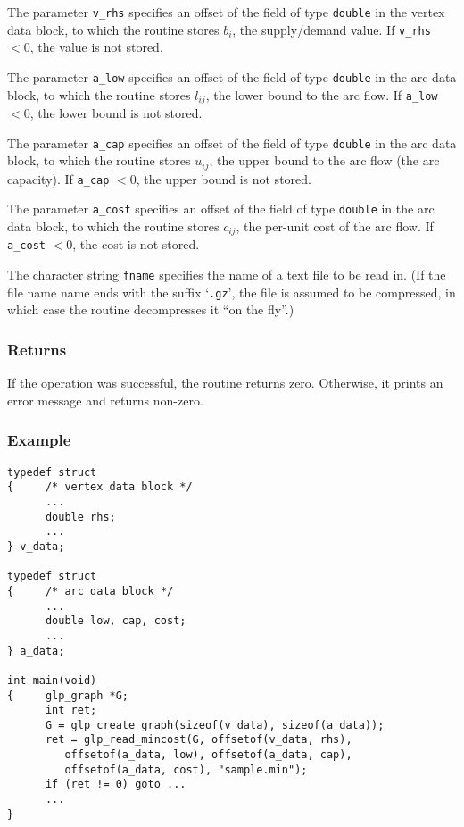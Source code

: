 The parameter \verb|v_rhs| specifies an offset of the field of type
\verb|double| in the vertex data block, to which the routine stores
$b_i$, the supply/demand value. If \verb|v_rhs| $<0$, the value is not
stored.

The parameter \verb|a_low| specifies an offset of the field of type
\verb|double| in the arc data block, to which the routine stores
$l_{ij}$, the lower bound to the arc flow. If \verb|a_low| $<0$, the
lower bound is not stored.

The parameter \verb|a_cap| specifies an offset of the field of type
\verb|double| in the arc data block, to which the routine stores
$u_{ij}$, the upper bound to the arc flow (the arc capacity). If
\verb|a_cap| $<0$, the upper bound is not stored.

The parameter \verb|a_cost| specifies an offset of the field of type
\verb|double| in the arc data block, to which the routine stores
$c_{ij}$, the per-unit cost of the arc flow. If \verb|a_cost| $<0$, the
cost is not stored.

The character string \verb|fname| specifies the name of a text file to
be read in. (If the file name name ends with the suffix `\verb|.gz|',
the file is assumed to be compressed, in which case the routine
decompresses it ``on the fly''.)

\subsubsection*{Returns}

If the operation was successful, the routine returns zero. Otherwise,
it prints an error message and returns non-zero.

\subsubsection*{Example}

\begin{footnotesize}
\begin{verbatim}
typedef struct
{     /* vertex data block */
      ...
      double rhs;
      ...
} v_data;

typedef struct
{     /* arc data block */
      ...
      double low, cap, cost;
      ...
} a_data;

int main(void)
{     glp_graph *G;
      int ret;
      G = glp_create_graph(sizeof(v_data), sizeof(a_data));
      ret = glp_read_mincost(G, offsetof(v_data, rhs),
         offsetof(a_data, low), offsetof(a_data, cap),
         offsetof(a_data, cost), "sample.min");
      if (ret != 0) goto ...
      ...
}
\end{verbatim}
\end{footnotesize}

